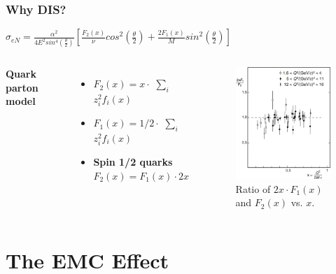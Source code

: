 \documentclass[12pt]{beamer}
\begin{document}
\begin{frame}
\frametitle{Why DIS?}
\vspace*{-15pt}
\centering
\large	$\sigma_{eN} = \frac{\alpha^2}{4E^2sin^4(\frac{\theta}{2})} [\frac{F_2(x)}{\nu}cos^2\left(\frac{\theta}{2}\right) + \frac{2F_1(x)}{M}sin^2\left(\frac{\theta}{2}\right)] $

\begin{columns}[c] %
	\textbf{Quark parton model}\\
\begin{itemize}
	\item $F_2(x) = x \cdot$ $\sum_{i}$ $z_i^2f_i(x) $
	\item $F_1(x) = 1/2 \cdot$ $\sum_{i}$ $z_i^2f_i(x)$
	\item  \textbf{Spin 1/2 quarks} $F_2(x) = F_1(x) \cdot2x$
\end{itemize}



\vspace*{-5pt}
\begin{figure}[t]
	\centering
	\includegraphics[width=4.5cm]{../images/Thesis/f1_f2_spin.pdf} 
	\caption*{Ratio of $2x\cdot F_1(x)$ and $F_2(x)$ vs. $x$. \cite{PnN}}
	
\end{figure}  
\end{columns}
\end{frame}

\section[EMC]{The EMC Effect}
\end{document}
